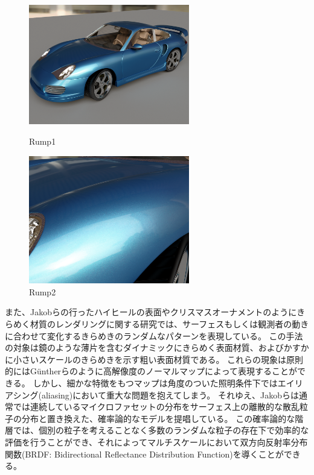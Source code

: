 \begin{figure}[htbp]
 \begin{minipage}{0.4\hsize}
  \begin{center}
   \includegraphics[width=70mm]{./img/porsche01.png}
  \end{center}
  \caption{Rump1}
  \label{FRump1}
 \end{minipage}
 \begin{minipage}{0.75\hsize}
  \begin{center}
    \includegraphics[width=70mm]{./img/porsche03.png}
  \end{center}
  \caption{Rump2}
  \label{FRump2}
 \end{minipage}
\end{figure}

\noindent
また、Jakobら\cite{jakob2014discrete}の行ったハイヒールの表面やクリスマスオーナメントのようにきらめく材質のレンダリングに関する研究では、サーフェスもしくは観測者の動きに合わせて変化するきらめきのランダムなパターンを表現している。
この手法の対象は鏡のような薄片を含むダイナミックにきらめく表面材質、およびかすかに小さいスケールのきらめきを示す粗い表面材質である。
これらの現象は原則的にはG\"{u}ntherらのように高解像度のノーマルマップによって表現することができる。
しかし、細かな特徴をもつマップは角度のついた照明条件下ではエイリアシング(aliasing)において重大な問題を抱えてしまう。
それゆえ、Jakobらは通常では連続しているマイクロファセットの分布をサーフェス上の離散的な散乱粒子の分布と置き換えた、確率論的なモデルを提唱している。
この確率論的な階層では、個別の粒子を考えることなく多数のランダムな粒子の存在下で効率的な評価を行うことができ、それによってマルチスケールにおいて双方向反射率分布関数(BRDF: Bidirectional Reflectance Distribution Function)を導くことができる。

